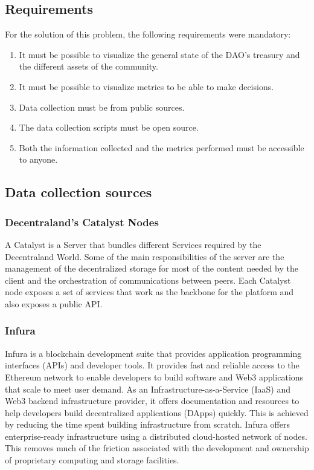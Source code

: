 \documentclass[MSE,Master,english]{twbook}%
\begin{document}
\subsection{Requirements}
For the solution of this problem, the following requirements were mandatory:
\begin{enumerate}
  \item It must be possible to visualize the general state of the DAO's treasury and the different assets of the community.
  \item It must be possible to visualize metrics to be able to make decisions.
  \item Data collection must be from public sources.
  \item The data collection scripts must be open source.
  \item Both the information collected and the metrics performed must be accessible to anyone.
\end{enumerate}

\subsection{Data collection sources}
\subsubsection{Decentraland's Catalyst Nodes}
A Catalyst\cite{catalyst} is a Server that bundles different Services required by the Decentraland World. Some of the main responsibilities of the server are the management of the decentralized storage for most of the content needed by the client and the orchestration of communications between peers. Each Catalyst node exposes a set of services that work as the backbone for the platform and also exposes a public API.\cite{catalyst2}


\subsubsection{Infura}
Infura\cite{infura} is a blockchain development suite that provides application programming interfaces (APIs) and developer tools. It provides fast and reliable access to the Ethereum network to enable developers to build software and Web3 applications that scale to meet user demand.
As an Infrastructure-as-a-Service (IaaS) and Web3 backend infrastructure provider, it offers documentation and resources to help developers build decentralized applications (\glspl{DApp}) quickly. This is achieved by reducing the time spent building infrastructure from scratch. Infura offers enterprise-ready infrastructure using a distributed cloud-hosted network of nodes. This removes much of the friction associated with the development and ownership of proprietary computing and storage facilities.\cite{infura}
\end{document}
